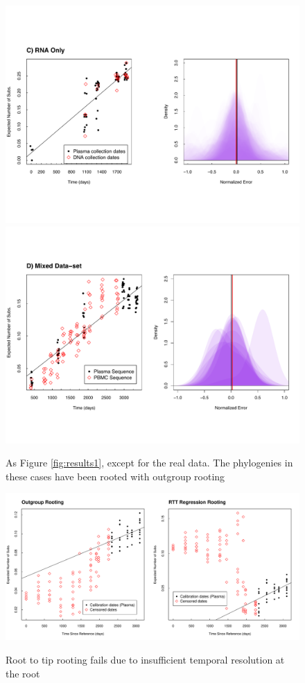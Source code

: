 \documentclass[12pt]{article}
\begin{document}
\begin{figure}[ht]
	\centering
	\includegraphics[width=\textwidth]{figures/ancre.pdf}
	\includegraphics[width=\textwidth]{figures/lanl.pdf}
	\caption[Examples]{As Figure \ref{fig:results1}, except for the real data.
The phylogenies in these cases have been rooted with outgroup rooting}
	\label{fig:results2}
\end{figure}

\begin{figure}[ht]
	\centering
	\includegraphics[scale=0.425]{figures/rtt.pdf} \\
	\caption[Example of bad root]{Root to tip rooting fails due to insufficient temporal resolution at the root}
	\label{fig:degenerate_example}
\end{figure}
\end{document}
